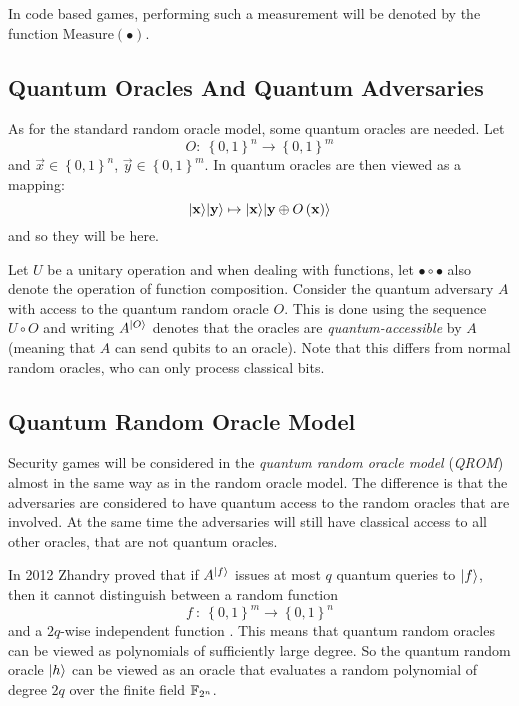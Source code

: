 In code based games, performing such a measurement will be denoted by the function \emph{$\mathrm{Measure}\left(\bullet\right)$}.



\subsection{Quantum Oracles And Quantum Adversaries}
\label{subsec:quaOraAndQuaAdv}

As for the standard random oracle model, some quantum oracles are needed. Let
\[
	O: \ \left\{ 0,1 \right\}^n \rightarrow \left\{ 0,1 \right\}^m
\]
and $\vec{x} \in \left\{ 0,1 \right\}^n$, $\vec{y} \in \left\{ 0,1 \right\}^m$.
In \cite{BBCMW,BDFLSZ} quantum oracles are then viewed as a mapping:
\[
	\lvert\boldsymbol{\mathrm{x}}\rangle\lvert\boldsymbol{\mathrm{y}}\rangle \mapsto \lvert\boldsymbol{\mathrm{x}}\rangle \lvert\boldsymbol{\mathrm{y}} \mathbin{\oplus} O\left(\boldsymbol{\mathrm{x}}\right)\rangle
\]
and so they will be here.

Let $U$ be a unitary operation and when dealing with functions, let $\bullet \circ \bullet$ also denote the operation of function composition. Consider the quantum adversary $A$ with access to the quantum random oracle $O$. This is done using the sequence $U \circ O$ and writing $A^{\lvert O\rangle}$ denotes that the oracles are \emph{quantum-accessible} by $A$ (meaning that $A$ can send qubits to an oracle). Note that this differs from normal random oracles, who can only process classical bits.



\subsection{Quantum Random Oracle Model}
\label{subsec:quaRanOraMod}

Security games will be considered in the \emph{quantum random oracle model} (\emph{QROM}) almost in the same way as in the random oracle model. The difference is that the adversaries are considered to have quantum access to the random oracles that are involved. At the same time the adversaries will still have classical access to all other oracles, that are not quantum oracles.

In 2012 Zhandry proved that if $A^{\lvert f\rangle}$ issues at most $q$ quantum queries to $\lvert f\rangle$, then it cannot distinguish between a random function
\[
	f \ : \ \left\{ 0,1 \right\}^m \rightarrow \left\{ 0,1 \right\}^n
\]
and a $2q$-wise independent function \cite{zhandry}. This means that quantum random oracles can be viewed as polynomials of sufficiently large degree. So the quantum random oracle $\lvert h\rangle$ can be viewed as an oracle that evaluates a random polynomial of degree $2q$ over the finite field $\mathbb{F}_{2^n}$.




